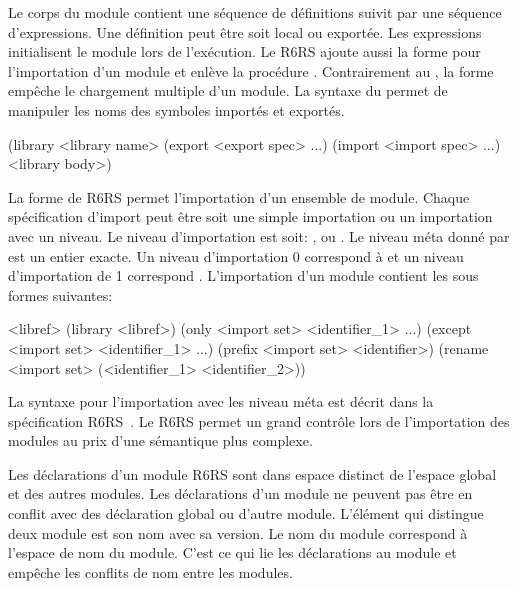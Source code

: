 Le corps du module contient une séquence de définitions suivit par une séquence
d'expressions. Une définition peut être soit local ou exportée. Les expressions
initialisent le module lors de l'exécution.  Le R6RS ajoute aussi la forme
 pour l'importation d'un module et enlève la procédure
.  Contrairement au , la forme 
empêche le chargement multiple d'un module.  La syntaxe du 
permet de manipuler les noms des symboles importés et exportés.\\
\begin{center}
  \begin{mplisting}{0.5}
(library <library name>
  (export <export spec> ...)
  (import <import spec> ...)
  <library body>)
\end{mplisting}
\end{center}

La forme  de R6RS permet l'importation d'un ensemble de module.
Chaque spécification d'import  peut être soit une simple
importation ou un importation avec un niveau. Le niveau d'importation est soit:
,  ou .  Le niveau méta
donné par  est un entier exacte. Un niveau d'importation 0
correspond à  et un niveau d'importation de 1 correspond
. L'importation d'un module contient les sous formes suivantes:
\begin{center}
\begin{mplisting}{0.7}
  <libref>
  (library <libref>)
  (only <import set> <identifier_1> ...)
  (except <import set> <identifier_1> ...)
  (prefix <import set> <identifier>)
  (rename <import set> (<identifier_1> <identifier_2>))
\end{mplisting}
\end{center}


La syntaxe pour l'importation avec les niveau méta est décrit dans la
spécification R6RS~\cite{Scheme:R6RS}. Le  R6RS permet un grand
contrôle lors de l'importation des modules au prix d'une sémantique plus complexe.

Les déclarations d'un module R6RS sont dans espace distinct de l'espace global et
des autres modules. Les déclarations d'un module ne peuvent pas être en conflit avec
des déclaration global ou d'autre module. L'élément qui distingue deux module est
son nom avec sa version. Le nom du module correspond à l'espace de nom du module.
C'est ce qui lie les déclarations au module et empêche les conflits de nom entre
les modules.


